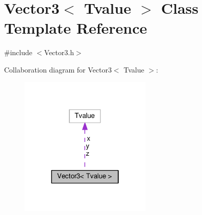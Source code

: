\hypertarget{class_vector3}{}\section{Vector3$<$ Tvalue $>$ Class Template Reference}
\label{class_vector3}


{\ttfamily \#include $<$Vector3.\+h$>$}



Collaboration diagram for Vector3$<$ Tvalue $>$\+:
\nopagebreak
\begin{figure}[H]
\begin{center}
\leavevmode
\includegraphics[width=178pt]{class_vector3__coll__graph}
\end{center}
\end{figure}
